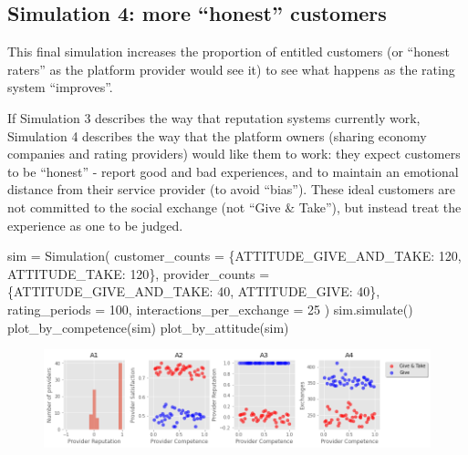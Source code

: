 \documentclass[
  letterpaper,
  DIV=11,
  numbers=noendperiod]{scrartcl}
\newenvironment{Shaded}{\begin{snugshade}}{\end{snugshade}}
\newcommand{\DecValTok}[1]{\textcolor[rgb]{0.68,0.00,0.00}{#1}}
\newcommand{\NormalTok}[1]{\textcolor[rgb]{0.00,0.23,0.31}{#1}}
\newcommand{\OperatorTok}[1]{\textcolor[rgb]{0.37,0.37,0.37}{#1}}
\begin{document}
\hypertarget{simulation-4-more-honest-customers}{%
\subsection{Simulation 4: more ``honest''
customers}\label{simulation-4-more-honest-customers}}

This final simulation increases the proportion of entitled customers (or
``honest raters'' as the platform provider would see it) to see what
happens as the rating system ``improves''.

If Simulation 3 describes the way that reputation systems currently
work, Simulation 4 describes the way that the platform owners (sharing
economy companies and rating providers) would like them to work: they
expect customers to be ``honest'' - report good and bad experiences, and
to maintain an emotional distance from their service provider (to avoid
``bias''). These ideal customers are not committed to the social
exchange (not ``Give \& Take''), but instead treat the experience as one
to be judged.

\begin{Shaded}
\begin{Highlighting}[]
\NormalTok{sim }\OperatorTok{=}\NormalTok{ Simulation(}
\NormalTok{    customer\_counts }\OperatorTok{=}\NormalTok{ \{ATTITUDE\_GIVE\_AND\_TAKE: }\DecValTok{120}\NormalTok{, ATTITUDE\_TAKE: }\DecValTok{120}\NormalTok{\},}
\NormalTok{    provider\_counts }\OperatorTok{=}\NormalTok{ \{ATTITUDE\_GIVE\_AND\_TAKE: }\DecValTok{40}\NormalTok{, ATTITUDE\_GIVE: }\DecValTok{40}\NormalTok{\},}
\NormalTok{    rating\_periods }\OperatorTok{=} \DecValTok{100}\NormalTok{,}
\NormalTok{    interactions\_per\_exchange }\OperatorTok{=} \DecValTok{25}
\NormalTok{    )}
\NormalTok{sim.simulate()}
\NormalTok{plot\_by\_competence(sim)}
\NormalTok{plot\_by\_attitude(sim)}
\end{Highlighting}
\end{Shaded}

\begin{figure}[H]

{\centering \includegraphics{provider-reputation_files/figure-pdf/cell-14-output-1.png}

}

\end{figure}
\end{document}
